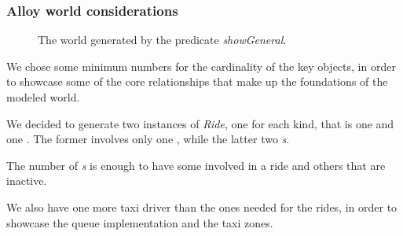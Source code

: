 \begin{landscape}
\subsubsection{Alloy world considerations} %
\label{ssub:alloy-world-considerations}
\begin{figure}[h!t]
\caption{The world generated by the predicate \emph{showGeneral}.}
	\noindent{}
\centering
\end{figure}
\end{landscape}

We chose some minimum numbers for the cardinality of the key objects, in order to showcase some of the core relationships that make up the foundations of the modeled world.

We decided to generate two instances of \emph{Ride}, one for each kind, that is one \emph{} and one \emph{}. The former involves only one \emph{}, while the latter two \emph{s}. 

The number of \emph{s} is enough to have some involved in a ride and others that are inactive.

We also have one more taxi driver than the ones needed for the rides, in order to showcase the queue implementation and the taxi zones.


